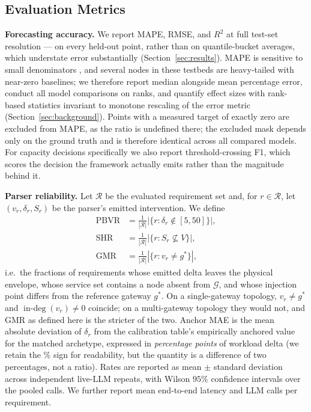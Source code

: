 \documentclass[journal, 10pt]{IEEEtran}
\begin{document}
\subsection{Evaluation Metrics}
\textbf{Forecasting accuracy.} We report MAPE, RMSE, and $R^2$ at full test-set resolution --- on every held-out point, rather than on quantile-bucket averages, which understate error substantially (Section~\ref{sec:results}). MAPE is sensitive to small denominators \cite{hyndman2006accuracy}, and several nodes in these testbeds are heavy-tailed with near-zero baselines; we therefore report median alongside mean percentage error, conduct all model comparisons on ranks, and quantify effect sizes with rank-based statistics invariant to monotone rescaling of the error metric (Section~\ref{sec:background}). Points with a measured target of exactly zero are excluded from MAPE, as the ratio is undefined there; the excluded mask depends only on the ground truth and is therefore identical across all compared models. For capacity decisions specifically we also report threshold-crossing F1, which scores the decision the framework actually emits rather than the magnitude behind it.

\textbf{Parser reliability.} Let $\mathcal{R}$ be the evaluated requirement set and, for $r\in\mathcal{R}$, let $(v_r,\delta_r,S_r)$ be the parser's emitted intervention. We define
\begin{align*}
\text{PBVR} &= \tfrac{1}{|\mathcal{R}|}\left|\{r : \delta_r \notin [5,50]\}\right|,\\
\text{SHR} &= \tfrac{1}{|\mathcal{R}|}\left|\{r : S_r \not\subseteq V\}\right|,\\
\text{GMR} &= \tfrac{1}{|\mathcal{R}|}\left|\{r : v_r \neq g^{*}\}\right|,
\end{align*}
i.e.\ the fractions of requirements whose emitted delta leaves the physical envelope, whose service set contains a node absent from $\mathcal{G}$, and whose injection point differs from the reference gateway $g^{*}$. On a single-gateway topology, $v_r \neq g^{*}$ and $\operatorname{in-deg}(v_r)\neq 0$ coincide; on a multi-gateway topology they would not, and GMR as defined here is the stricter of the two. Anchor MAE is the mean absolute deviation of $\delta_r$ from the calibration table's empirically anchored value for the matched archetype, expressed in \emph{percentage points} of workload delta (we retain the \% sign for readability, but the quantity is a difference of two percentages, not a ratio). Rates are reported as mean $\pm$ standard deviation across independent live-LLM repeats, with Wilson $95\%$ confidence intervals over the pooled calls. We further report mean end-to-end latency and LLM calls per requirement.
\end{document}

